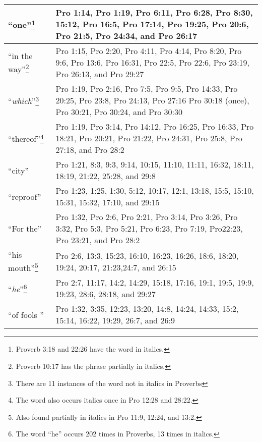 \begin{center}
\begin{longtable}{l|p{3.75in}}
``one''\footnote{Proverb 3:18 and 22:26 have the word in italics.} & Pro 1:14, Pro 1:19, Pro 6:11, Pro 6:28, Pro 8:30, 15:12, Pro 16:5, Pro 17:14, Pro 19:25, Pro 20:6, Pro 21:5, Pro 24:34, and Pro 26:17  \\ \hline

``in the way''\footnote{Proverb 10:17 has the phrase partially in italics.} & Pro 1:15, Pro 2:20, Pro 4:11, Pro 4:14, Pro 8:20, Pro 9:6, Pro 13:6, Pro 16:31, Pro 22:5, Pro 22:6, Pro 23:19, Pro 26:13, and Pro 29:27
  \\ \hline
  
``\emph{which}''\footnote{There are 11 instances of the word  not in italics in Proverbs} & Pro 1:19, Pro 2:16, Pro 7:5, Pro 9:5, Pro 14:33, Pro 20:25, Pro 23:8, Pro 24:13, Pro 27:16 Pro 30:18 (once), Pro 30:21, Pro 30:24, and Pro 30:30 \\ \hline

``thereof''\footnote{The word also occurs italics once in Pro 12:28 and 28:22.} & Pro 1:19, Pro 3:14, Pro 14:12, Pro 16:25, Pro 16:33, Pro 18:21, Pro 20:21, Pro 21:22, Pro 24:31, Pro 25:8, Pro 27:18, and Pro 28:2 \\ \hline

``city'' & Pro  1:21, 8:3, 9:3, 9:14, 10:15, 11:10, 11:11, 16:32, 18:11, 18:19, 21:22,  25:28, and 29:8 \\ \hline


``reproof'' & Pro 1:23, 1:25, 1:30, 5:12, 10:17, 12:1, 13:18, 15:5, 15:10, 15:31, 15:32,  17:10, and 29:15 \\ \hline

``For the'' &  Pro  1:32, Pro 2:6, Pro 2:21, Pro 3:14, Pro 3:26, Pro 3:32, Pro 5:3, Pro 5:21, Pro 6:23, Pro 7:19, Pro22:23, Pro 23:21, and Pro 28:2 \\ \hline

``his mouth''\footnote{Also found partially in italics in Pro 11:9, 12:24, and 13:2.} & Pro 2:6, 13:3, 15:23, 16:10, 16:23, 16:26, 18:6, 18:20, 19:24, 20:17, 21:23,24:7, and 26:15 \\ \hline


``\emph{he}''\footnote{The word ``he'' occurs 202 times in Proverbs, 13 times in italics.} &  Pro 2:7, 11:17, 14:2, 14:29, 15:18, 17:16, 19:1, 19:5, 19:9, 19:23, 28:6, 28:18, and 29:27\\ \hline


``of fools '' & Pro 1:32, 3:35, 12:23, 13:20, 14:8, 14:24, 14:33, 15:2, 15:14, 16:22, 19:29, 26:7, and 26:9 \\ \hline


\end{longtable}
\end{center}
